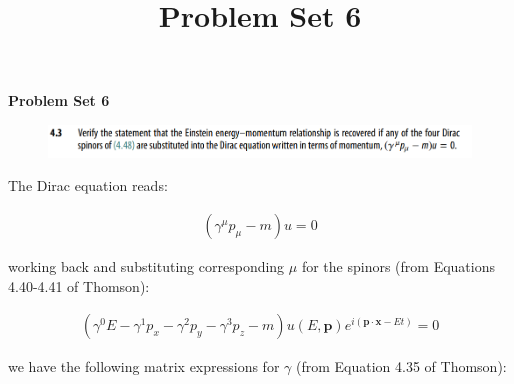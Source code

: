 \documentclass[11pt]{article}
\theoremstyle{definition}
\begin{document}
\setcounter{section}{2}
\title{Problem Set 6}

\pagestyle{fancy}
\fancyhf{}

\begin{center}
{\LARGE \bf Problem Set 6}\\
\end{center}

\begin{figure}[h!]
    \centering
    \includegraphics[scale = 0.5]{4.3.png}
\end{figure}

The Dirac equation reads:

\begin{align}
    (\gamma^{\mu} p_{\mu} - m)u = 0
\end{align}

working back and substituting corresponding $\mu$ for the spinors (from Equations 4.40-4.41 of Thomson):

\begin{align}\label{expanded dirac}
    (\gamma^{0} E - \gamma^{1} p_{x} - \gamma^{2} p_{y} - \gamma^{3} p_{z} - m) u(E,\mathbf{p}) e^{i(\mathbf{p}\cdot\mathbf{x} - Et)}  = 0
\end{align}

we have the following matrix expressions for $\gamma$ (from Equation 4.35 of Thomson):
\end{document}
